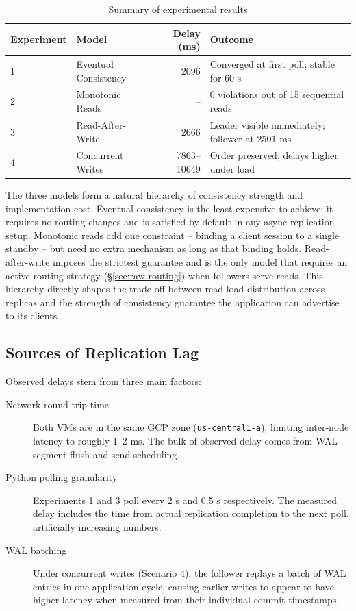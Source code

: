 \documentclass[12pt,a4paper]{article}
\begin{document}
\begin{table}[H]
\centering
\caption{Summary of experimental results}
\begin{tabular}{llrp{5.5cm}}
\toprule
\textbf{Experiment} & \textbf{Model} & \textbf{Delay (ms)} & \textbf{Outcome} \\
\midrule
1 & Eventual Consistency & 2096 & Converged at first poll; stable for 60 s \\
2 & Monotonic Reads & -- & 0 violations out of 15 sequential reads \\
3 & Read-After-Write & 2666 & Leader visible immediately; follower at 2501 ms \\
4 & Concurrent Writes & 7863--10649 & Order preserved; delays higher under load \\
\bottomrule
\end{tabular}
\end{table}

The three models form a natural hierarchy of consistency strength and
implementation cost. Eventual consistency is the least expensive to achieve:
it requires no routing changes and is satisfied by default in any async
replication setup. Monotonic reads add one constraint -- binding a client
session to a single standby -- but need no extra mechanism as long as that
binding holds. Read-after-write imposes the strictest guarantee and is the
only model that requires an active routing strategy (§\ref{sec:raw-routing})
when followers serve reads. This hierarchy directly shapes the trade-off
between read-load distribution across replicas and the strength of consistency
guarantee the application can advertise to its clients.

\subsection{Sources of Replication Lag}

Observed delays stem from three main factors:

\begin{description}    \item[Network round-trip time] Both VMs are in the same GCP zone
        (\texttt{us-central1-a}), limiting inter-node latency to roughly 1--2 ms.
        The bulk of observed delay comes from WAL segment flush and send scheduling.
    \item[Python polling granularity] Experiments 1 and 3 poll every 2 s and
        0.5 s respectively. The measured delay includes the time from actual
        replication completion to the next poll, artificially increasing numbers.
    \item[WAL batching] Under concurrent writes (Scenario 4), the follower
        replays a batch of WAL entries in one application cycle, causing earlier
        writes to appear to have higher latency when measured from their individual
        commit timestamps.
\end{description}
\end{document}

